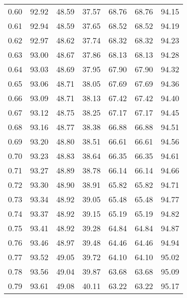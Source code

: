 \begin{tabular}{|c|c|c|c|c|c|c|}
      0.60 &     92.92 &     48.59 &      37.57 &   68.76 &      68.76 &         94.15 \\
      0.61 &     92.94 &     48.59 &      37.65 &   68.52 &      68.52 &         94.19 \\
      0.62 &     92.97 &     48.62 &      37.74 &   68.32 &      68.32 &         94.23 \\
      0.63 &     93.00 &     48.67 &      37.86 &   68.13 &      68.13 &         94.28 \\
      0.64 &     93.03 &     48.69 &      37.95 &   67.90 &      67.90 &         94.32 \\
      0.65 &     93.06 &     48.71 &      38.05 &   67.69 &      67.69 &         94.36 \\
      0.66 &     93.09 &     48.71 &      38.13 &   67.42 &      67.42 &         94.40 \\
      0.67 &     93.12 &     48.75 &      38.25 &   67.17 &      67.17 &         94.45 \\
      0.68 &     93.16 &     48.77 &      38.38 &   66.88 &      66.88 &         94.51 \\
      0.69 &     93.20 &     48.80 &      38.51 &   66.61 &      66.61 &         94.56 \\
      0.70 &     93.23 &     48.83 &      38.64 &   66.35 &      66.35 &         94.61 \\
      0.71 &     93.27 &     48.89 &      38.78 &   66.14 &      66.14 &         94.66 \\
      0.72 &     93.30 &     48.90 &      38.91 &   65.82 &      65.82 &         94.71 \\
      0.73 &     93.34 &     48.92 &      39.05 &   65.48 &      65.48 &         94.77 \\
      0.74 &     93.37 &     48.92 &      39.15 &   65.19 &      65.19 &         94.82 \\
      0.75 &     93.41 &     48.92 &      39.28 &   64.84 &      64.84 &         94.87 \\
      0.76 &     93.46 &     48.97 &      39.48 &   64.46 &      64.46 &         94.94 \\
      0.77 &     93.52 &     49.05 &      39.72 &   64.10 &      64.10 &         95.02 \\
      0.78 &     93.56 &     49.04 &      39.87 &   63.68 &      63.68 &         95.09 \\
      0.79 &     93.61 &     49.08 &      40.11 &   63.22 &      63.22 &         95.17 \\

\end{tabular}
